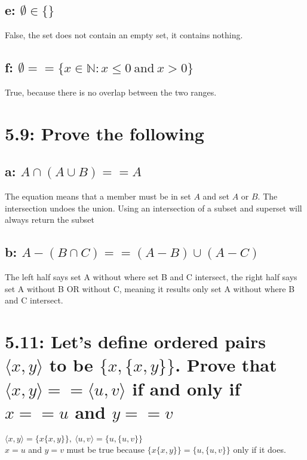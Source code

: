 \documentclass{article}
\begin{document}
\subsection*{e: $\emptyset \in \{\}$}
False, the set does not contain an empty set, it contains nothing. 
\subsection*{f: $\emptyset == \{x \in \mathbb{N}: x \leq 0 \: \textrm{and} \: x > 0 \}$ }
True, because there is no overlap between the two ranges. 
\section*{5.9: Prove the following}
\subsection*{a: $A \cap (A \cup B) == A$}
The equation means that a member must be in set $A$ and set $A$ or $B$. The intersection undoes the union. Using an intersection of a subset and superset will always return the subset
\subsection*{b: $A-(B \cap C) == (A-B) \cup (A-C)$}
The left half says set A without where set B and C intersect, the right half says set A without B OR without C, meaning it results only set A without where B and C intersect.
\section*{5.11: Let's define ordered pairs $\langle x,y \rangle$ to be $\{x,\{x,y\}\}$. Prove that $\langle x,y \rangle == \langle u,v \rangle $ if and only if $x==u$ and $y==v$}
$\langle x,y \rangle = \{x\{x,y\}\}, \: \langle u,v \rangle = \{u,\{u,v\}\}$ \\
$x = u$ and $y = v$ must be true because $\{x\{x,y\}\} = \{u,\{u,v\}\}$ only if it does.
\end{document}
